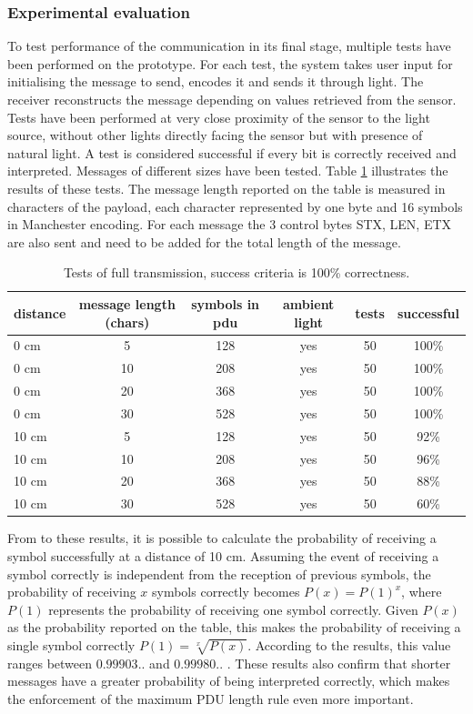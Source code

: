 \subsubsection{Experimental evaluation}
To test performance of the communication in its final stage, multiple tests have been performed on the prototype.
For each test, the system takes user input for initialising the message to send, encodes it and sends it through light. 
The receiver reconstructs the message depending on values retrieved from the sensor.
Tests have been performed at very close proximity of the sensor to the light source, without other lights directly facing the sensor but with presence of natural light.
A test is considered successful if every bit is correctly received and interpreted.
Messages of different sizes have been tested.
Table \ref{tab:txresults} illustrates the results of these tests.
The message length reported on the table is measured in characters of the payload, each character represented by one byte and 16 symbols in Manchester encoding.
For each message the 3 control bytes STX, LEN, ETX are also sent and need to be added for the total length of the message.
%
\begin{table}[hbt]
\centering
  \begin{tabular}{l c c c c c}
    distance & message length (chars) & symbols in pdu &  ambient light & tests & successful \\
    \hline
   0 cm & 5 & 128 & yes & 50 & 100\% \\
   0 cm & 10 & 208 & yes & 50 & 100\% \\
   0 cm & 20 & 368 & yes & 50 & 100\% \\
   0 cm & 30 & 528 & yes & 50 & 100\% \\
   10 cm & 5 & 128 & yes & 50 & 92\% \\
   10 cm & 10 & 208 & yes & 50 & 96\% \\
   10 cm & 20 & 368 & yes & 50 & 88\% \\
   10 cm & 30 & 528 & yes & 50 & 60\% \\
  \end{tabular}
  \caption{Tests of full transmission, success criteria is 100\% correctness.}
  \label{tab:txresults}
\end{table}
%
From to these results, it is possible to calculate the probability of receiving a symbol successfully at a distance of 10 cm.
Assuming the event of receiving a symbol correctly is independent from the reception of previous symbols, the probability of receiving $x$ symbols correctly becomes $P(x) = P(1)^x$, where $P(1)$ represents the probability of receiving one symbol correctly. 
Given $P(x)$ as the probability reported on the table, this makes the probability of receiving a single symbol correctly $P(1) = \sqrt[x]{P(x)}$.
According to the results, this value ranges between $0.99903..$ and $0.99980..$ .
These results also confirm that shorter messages have a greater probability of being interpreted correctly, which makes the enforcement of the maximum PDU length rule even more important.

